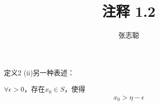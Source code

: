 \documentclass{article}
\begin{document}
\title{注释 1.2}
\author{张志聪}
\maketitle

\begin{zremark}
  定义2 (ii)另一种表述：

  $\forall \epsilon > 0$，存在$x_0 \in S$，使得
  \begin{align*}
    x_0 > \eta - \epsilon
  \end{align*}
\end{zremark}
\end{document}
